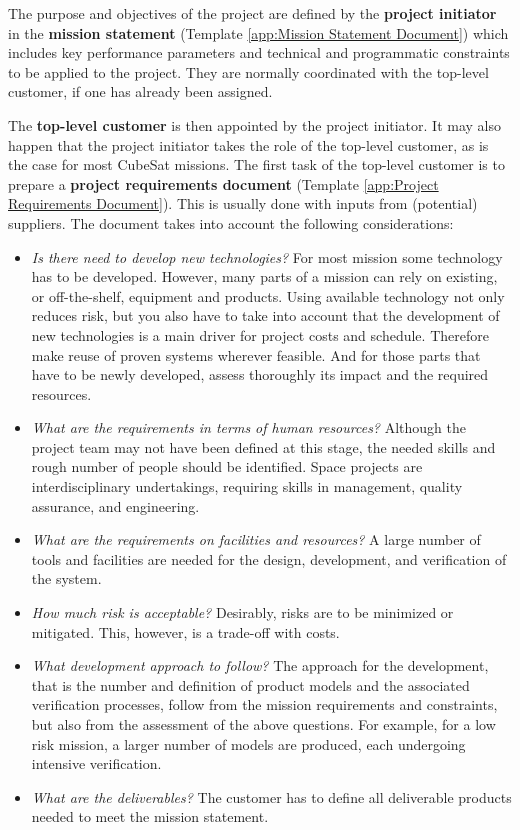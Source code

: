The purpose and objectives of the project are defined by the \textbf{project initiator} in the \textbf{mission statement} (Template \ref{app:Mission Statement Document}) which includes key performance parameters and technical and programmatic constraints to be applied to the project. They are normally coordinated with the top-level customer, if one has already been assigned.

The \textbf{top-level customer} is then appointed by the project initiator. It may also happen that the project initiator takes the role of the top-level customer, as is the case for most CubeSat missions. The first task of the top-level customer is to prepare a \textbf{project requirements document} (Template \ref{app:Project Requirements Document}). This is usually done with inputs from (potential) suppliers. The document takes into account the following considerations:

\begin{itemize}

\item \textit{Is there need to develop new technologies?} For most mission some technology has to be developed. However, many parts of a mission can rely on existing, or off-the-shelf, equipment and products. Using available technology not only reduces risk, but you also have to take into account that the development of new technologies is a main driver for project costs and schedule. Therefore make reuse of proven systems wherever feasible. And for those parts that have to be newly developed, assess thoroughly its impact and the required resources.

\item \textit{What are the requirements in terms of human resources?} Although the project team may not have been defined at this stage, the needed skills and rough number of people should be identified. Space projects are interdisciplinary undertakings, requiring skills in management, quality assurance, and engineering. 

\item \textit{What are the requirements on facilities and resources?} A large number of tools and facilities are needed for the design, development, and verification of the system. 

\item \textit{How much risk is acceptable?} Desirably, risks are to be minimized or mitigated. This, however, is a trade-off with costs. 

\item \textit{What development approach to follow?} The approach for the development, that is the number and definition of product models and the associated verification processes, follow from the mission requirements and constraints, but also from the assessment of the above questions. For example, for a low risk mission, a larger number of models are produced, each undergoing intensive verification.

\item \textit{What are the deliverables?} The customer has to define all deliverable products needed to meet the mission statement.

\end{itemize}


